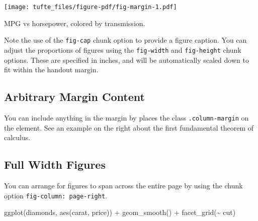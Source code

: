 \documentclass[
  letterpaper,
  DIV=11,
  numbers=noendperiod,
  oneside]{scrartcl}
\newenvironment{Shaded}{\begin{snugshade}}{\end{snugshade}}
\newcommand{\FunctionTok}[1]{\textcolor[rgb]{0.28,0.35,0.67}{#1}}
\newcommand{\NormalTok}[1]{\textcolor[rgb]{0.00,0.23,0.31}{#1}}
\newcommand{\SpecialCharTok}[1]{\textcolor[rgb]{0.37,0.37,0.37}{#1}}
\begin{document}
\begin{marginfigure}

{\centering \texttt{[image: tufte\_files/figure-pdf/fig-margin-1.pdf]}

}

\caption{\label{fig-margin}MPG vs horsepower, colored by transmission.}

\end{marginfigure}

Note the use of the \texttt{fig-cap} chunk option to provide a figure
caption. You can adjust the proportions of figures using the
\texttt{fig-width} and \texttt{fig-height} chunk options. These are
specified in inches, and will be automatically scaled down to fit within
the handout margin.

\hypertarget{arbitrary-margin-content}{%
\subsection{Arbitrary Margin Content}\label{arbitrary-margin-content}}

You can include anything in the margin by places the class
\texttt{.column-margin} on the element. See an example on the right
about the first fundamental theorem of calculus.


\hypertarget{full-width-figures}{%
\subsection{Full Width Figures}\label{full-width-figures}}

You can arrange for figures to span across the entire page by using the
chunk option \texttt{fig-column:\ page-right}.

\begin{Shaded}
\begin{Highlighting}[]
\FunctionTok{ggplot}\NormalTok{(diamonds, }\FunctionTok{aes}\NormalTok{(carat, price)) }\SpecialCharTok{+} \FunctionTok{geom\_smooth}\NormalTok{() }\SpecialCharTok{+}
  \FunctionTok{facet\_grid}\NormalTok{(}\SpecialCharTok{\textasciitilde{}}\NormalTok{ cut)}
\end{Highlighting}
\end{Shaded}
\end{document}
